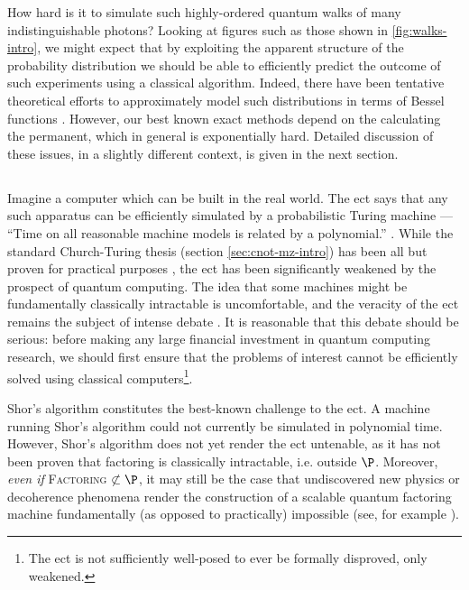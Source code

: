 How hard is it to simulate such highly-ordered quantum walks of many indistinguishable photons? Looking at figures such as those shown in \ref{fig:walks-intro}, we might expect that by exploiting the apparent structure of the probability distribution we should be able to efficiently predict the outcome of such experiments using a classical algorithm. Indeed, there have been tentative theoretical efforts to approximately model such distributions in terms of Bessel functions \cite{Bessen2006}. However, our best known exact methods depend on the calculating the permanent, which in general is exponentially hard. Detailed discussion of these issues, in a slightly different context, is given in the next section.

\subsection{\bosonsampling}
\label{sec:bosonsampling}
\newcommand{\bsdist}{\mathcal{B}}
\newcommand{\usdist}{\mathcal{F}}
\newcommand{\csdist}{\mathcal{C}}
Imagine a computer which can be built in the real world. The \gls{ect} says that any such apparatus can be efficiently simulated by a probabilistic Turing machine ---  ``Time on all reasonable machine models is related by a polynomial.'' \cite{Parberry}.
While the standard Church-Turing thesis (section \ref{sec:cnot-mz-intro}) has been all but proven for practical purposes \cite{Dershowitz2008}, the \gls{ect} has been significantly weakened by the prospect of quantum computing. The idea that some machines might be fundamentally classically intractable is uncomfortable, and the veracity of the \gls{ect} remains the subject of intense debate \cite{Dershowitz2011}. It is reasonable that this debate should be serious: before making any large financial investment in quantum computing research, we should first ensure that the problems of interest cannot be efficiently solved using classical computers\footnote{The \gls{ect} is not sufficiently well-posed to ever be formally disproved, only weakened.}. 

Shor's algorithm constitutes the best-known challenge to the \gls{ect}. A machine running Shor's algorithm could not currently be simulated in polynomial time. However, Shor's algorithm does not yet render the \gls{ect} untenable, as it has not been proven that factoring is classically intractable, i.e. outside $\P$. Moreover, \emph{even if}  \textsc{Factoring} $\not\subset \P$, it may still be the case that undiscovered new physics or decoherence phenomena render the construction of a scalable quantum factoring machine fundamentally (as opposed to practically) impossible (see, for example \cite{Kalai2011}).

